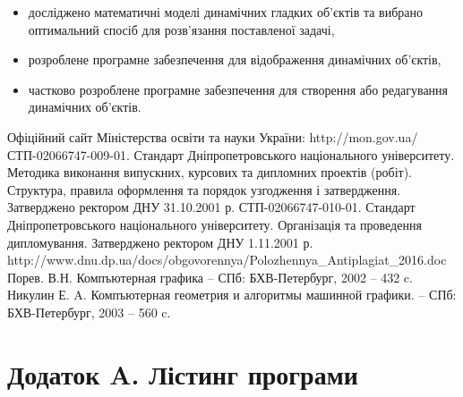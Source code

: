 \documentclass[14pt,a4paper]{extarticle}
\theoremstyle{definition}
\renewcommand{\[}{\begin{singlespace}\begin{equation*}}
\renewcommand{\]}{\end{equation*}\end{singlespace}}
\begin{document}
\begin{itemize}
\item досліджено математичні моделі динамічних гладких об'єктів та вибрано оптимальний спосіб для розв'язання поставленої задачі,
\item розроблене програмне забезпечення для відображення динамічних об'єктів,
\item частково розроблене програмне забезпечення для створення або редагування динамічних об'єктів.
\end{itemize}

\begin{thebibliography}{9}
\bibitem{} Офіційний сайт Міністерства освіти та науки України: http://mon.gov.ua/
\bibitem{} СТП-02066747-009-01. Стандарт Дніпропетровського національного університету. Методика виконання випускних, курсових та дипломних проектів (робіт). Структура, правила оформлення та порядок узгодження і затвердження. Затверджено ректором ДНУ 31.10.2001 р.
\bibitem{} СТП-02066747-010-01. Стандарт Дніпропетровського національного університету. Організація та проведення дипломування. Затверджено ректором ДНУ 1.11.2001 р.
\bibitem{} http://www.dnu.dp.ua/docs/obgovorennya/Polozhennya\_Antiplagiat\_2016.doc
 Порев. В.Н. Компъютерная графика -- СПб: БХВ-Петербург, 2002 -- 432 c.
 Никулин Е. A. Компъютерная геометрия и алгоритмы машинной графики. -- СПб: БХВ-Петербург, 2003 -- 560 c.
\end{thebibliography}

\section*{Додаток A. Лістинг програми}
\tiny
\singlespacing
\end{document}
